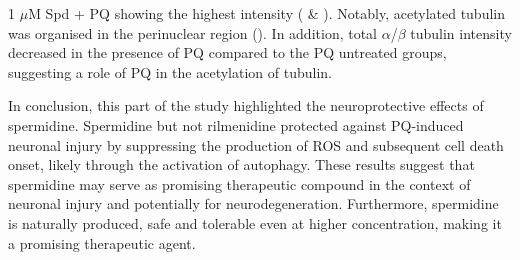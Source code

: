1 $\mu$M Spd + PQ showing the highest intensity ( \& ). Notably, acetylated tubulin was organised in the perinuclear region (). In addition, total $\alpha$/$\beta$ tubulin intensity decreased in the presence of PQ compared to the PQ untreated groups, suggesting a role of PQ in the acetylation of tubulin.

In conclusion, this part of the study highlighted the neuroprotective effects of spermidine. Spermidine but not rilmenidine protected against PQ-induced neuronal injury by suppressing the production of ROS and subsequent cell death onset, likely through the activation of autophagy. These results suggest that spermidine may serve as promising therapeutic compound  in the context of neuronal injury and potentially for neurodegeneration. Furthermore, spermidine is naturally produced, safe and tolerable even at higher concentration, making it a promising therapeutic agent.








